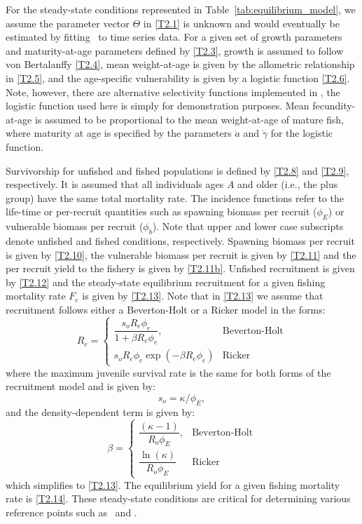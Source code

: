 \begin{multicols}{2}
For the steady-state conditions represented in Table~\ref{tab:equilibrium_model}, we assume the parameter vector $\Theta$ in \eqref{T2.1} is unknown and would eventually be estimated by fitting \iscam\ to time series data.  For a given set of growth parameters and maturity-at-age parameters defined by \eqref{T2.3}, growth is assumed to follow von Bertalanffy \eqref{T2.4}, mean weight-at-age is given by the allometric relationship in \eqref{T2.5}, and the age-specific vulnerability is given by a logistic function \eqref{T2.6}.  Note, however, there are alternative selectivity functions implemented in \iscam, the logistic function used here is simply for demonstration purposes.  Mean fecundity-at-age is assumed to be proportional to the mean weight-at-age of mature fish, where maturity at age is specified by the parameters $\dot{a}$ and $\dot{\gamma}$ for the logistic function.

Survivorship for unfished and fished populations is defined by \eqref{T2.8} and \eqref{T2.9}, respectively.  It is assumed that all individuals ages $A$ and older (i.e., the plus group) have the same total mortality rate.  The incidence functions refer to the life-time or per-recruit quantities such as spawning biomass per recruit ($\phi_E$) or vulnerable biomass per recruit ($\phi_b$).  Note that upper and lower case subscripts denote unfished and fished conditions, respectively.  Spawning biomass per recruit is given by \eqref{T2.10}, the vulnerable biomass per recruit is given by \eqref{T2.11} and the per recruit yield to the fishery is given by \eqref{T2.11b}.  Unfished recruitment is given by \eqref{T2.12} and the steady-state equilibrium recruitment  for a given fishing mortality rate $F_e$ is given by \eqref{T2.13}.  Note that in \eqref{T2.13} we assume that recruitment follows either a  Beverton-Holt or a Ricker model in the forms:
\[
R_e=\begin{cases}
    \dfrac{s_o R_e \phi_e}{1+\beta R_e \phi_e},& \mbox{Beverton-Holt}\\[5ex]
    s_o R_e \phi_e \exp(-\beta R_e \phi_e)& \mbox{Ricker}
\end{cases}
\]
where the maximum juvenile survival rate is the same for both forms of the recruitment model and is given by:
\[
s_o = \kappa/\phi_E,
\]
and the density-dependent term is given by:
\[
\beta =\begin{cases}
    \dfrac{(\kappa-1)}{R_o\phi_E}, & \mbox{Beverton-Holt}\\[5ex]
    {\dfrac {\ln  \left( \kappa \right) }{R_{{o}}\phi_{{E}}}} & \mbox{Ricker}
\end{cases} 
\]
which simplifies to \eqref{T2.13}.
 The equilibrium yield for a given fishing mortality rate is \eqref{T2.14}.  These steady-state conditions are critical for determining various reference points such as \fmsy\ and \bmsy.  




\end{multicols}
